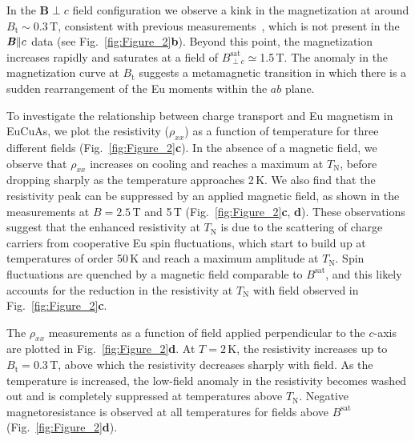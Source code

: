 \documentclass[aps,prl,amsmath,amssymb,amstext,citeautoscript,punctuation,nofootinbib,superscriptaddress,twocolumn]{revtex4-1}
\newcommand{\eca}{EuCuAs}
\begin{document}
In the $\textbf{B}$$\perp$$c$ field configuration we observe a kink in the magnetization at around $B_\mathrm{t}\sim 0.3$\,T, consistent with previous measurements~\cite{tong2014magnetic}, %
which is not present in the $\textbf{\textit{B}}\|c$ data (see Fig.~\ref{fig:Figure_2}\textbf{b}). Beyond this point, the magnetization increases rapidly and saturates at a field of $B_{\perp c}^\mathrm{sat}\simeq$1.5\,T. The anomaly in the magnetization curve at $B_\mathrm{t}$ suggests a metamagnetic transition in which there is a sudden rearrangement of the Eu moments within the $ab$ plane.

To investigate the relationship between charge transport and Eu magnetism in \eca, we plot the resistivity ($\rho_{xx}$) as a function of temperature for three different fields (Fig.~\ref{fig:Figure_2}\textbf{c}). In the absence of a magnetic field, we observe that $\rho_{xx}$ increases on cooling and reaches a maximum at $T_\mathrm{N}$, before dropping sharply as the temperature approaches 2\,K.  We also find that the resistivity peak can be suppressed by an applied magnetic field, as shown in the measurements at $B = 2.5$\,T and 5\,T (Fig.~\ref{fig:Figure_2}\textbf{c}, \textbf{d}). These observations suggest  that the enhanced resistivity at $T_\mathrm{N}$ is due to the scattering of charge carriers from cooperative Eu spin fluctuations,  which start to build up at temperatures of order 50\,K and reach a maximum amplitude at $T_\mathrm{N}$. Spin fluctuations are quenched by a magnetic field comparable to $B^\textrm{sat}$, and this likely accounts for the reduction in the resistivity at $T_\mathrm{N}$ with field observed in Fig.~\ref{fig:Figure_2}\textbf{c}.  

The $\rho_{xx}$ measurements as a function of field applied perpendicular to the  $c$-axis are plotted in Fig.~\ref{fig:Figure_2}\textbf{d}. At $T=2$\,K, the resistivity increases up to $B_\mathrm{t} = 0.3$\,T, above which the resistivity decreases sharply with field. As the temperature is increased, the low-field anomaly in the resistivity becomes washed out and is completely suppressed at temperatures above $T_\mathrm{N}$. Negative magnetoresistance is observed at all temperatures for fields above $B^\textrm{sat}$ (Fig.~\ref{fig:Figure_2}\textbf{d}). 
\end{document}
